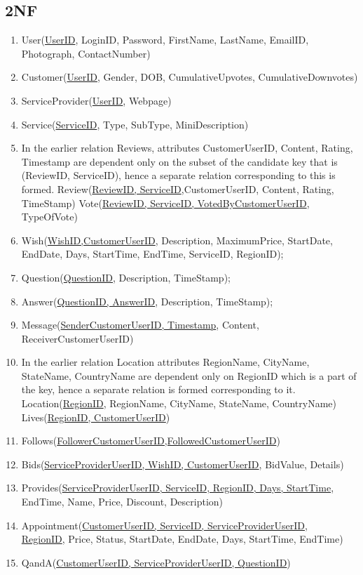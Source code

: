 \documentclass[a4paper]{article}
\begin{document}
\subsection{2NF}
\begin{enumerate}

\item User(\underline{UserID}, LoginID, Password, FirstName, LastName, EmailID, Photograph, ContactNumber)

\item Customer(\underline{UserID}, Gender, DOB, CumulativeUpvotes, CumulativeDownvotes)

\item ServiceProvider(\underline{UserID}, Webpage)

\item Service(\underline{ServiceID}, Type, SubType, MiniDescription)

\item In the earlier relation Reviews, attributes CustomerUserID, Content, Rating, Timestamp are dependent only on the subset of the candidate key that is (ReviewID, ServiceID), hence a separate relation corresponding to this is formed.
\subitem Review(\underline{ReviewID, ServiceID},CustomerUserID, Content, Rating, TimeStamp)
\subitem Vote(\underline{ReviewID, ServiceID, VotedByCustomerUserID}, TypeOfVote)

\item Wish(\underline{WishID,CustomerUserID}, Description, MaximumPrice, StartDate, EndDate, Days, StartTime, EndTime, ServiceID, RegionID);

\item Question(\underline{QuestionID}, Description, TimeStamp);

\item Answer(\underline{QuestionID, AnswerID}, Description, TimeStamp);

\item Message(\underline {SenderCustomerUserID, Timestamp}, Content, ReceiverCustomerUserID)

\item In the earlier relation Location attributes RegionName, CityName, StateName, CountryName are dependent only on RegionID which is a part of the key, hence a separate relation is formed corresponding to it.
\subitem Location(\underline{RegionID}, RegionName, CityName, StateName, CountryName)
\subitem Lives(\underline{RegionID, CustomerUserID})

\item Follows(\underline{FollowerCustomerUserID,FollowedCustomerUserID})
\item Bids(\underline{ServiceProviderUserID, WishID, CustomerUserID}, BidValue, Details)
\item Provides(\underline{ServiceProviderUserID, ServiceID, RegionID, Days, StartTime}, EndTime, Name, Price, Discount, Description)
\item Appointment(\underline{CustomerUserID, ServiceID, ServiceProviderUserID},\\ \underline{RegionID}, Price, Status, StartDate, EndDate, Days, StartTime, EndTime)  
\item QandA(\underline{CustomerUserID, ServiceProviderUserID, QuestionID})


\end{enumerate}
\end{document}
